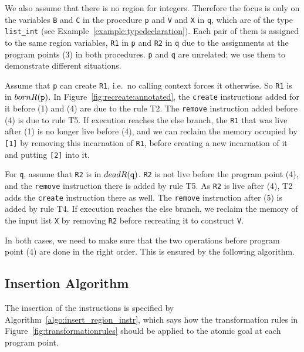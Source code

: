 \documentclass{tlp}
\newcommand{\bornR}[1]{\ensuremath{{bornR}(#1)}}
\newcommand{\deadR}[1]{\ensuremath{{deadR}(#1)}}
\newcommand{\code}[1]{{\tt#1}}
\begin{document}
We also assume that there is no region for integers.
Therefore the focus is only on
the variables \code{B} and \code{C} in the procedure \code{p} and
\code{V} and \code{X} in \code{q},
which are of the type \code{list\_int}
(see Example~\ref{example:typedeclaration}).
Each pair of them is assigned to the same region variables,
\code{R1} in \code{p} and \code{R2} in \code{q}
due to the assignments at the program points (3) in both procedures.
\code{p} and \code{q} are unrelated;
we use them to demonstrate different situations.

Assume that \code{p} can create \code{R1},
i.e.\ no calling context forces it otherwise.
So \code{R1} is in \bornR{\code{p}}.
In Figure~\ref{fig:recreate:annotated},
the \code{create} instructions added for it before (1) and (4)
are due to the rule T2.
The \code{remove} instruction added before (4) is due to rule T5.
If execution reaches the else branch,
the \code{R1} that was live after (1) is no longer live before (4),
and we can reclaim the memory occupied by \code{[1]}
by removing this incarnation of \code{R1},
before creating a new incarnation of it
and putting \code{[2]} into it.

For \code{q}, assume that \code{R2} is in \deadR{\code{q}}.
\code{R2} is not live before the program point (4),
and the \code{remove} instruction there is added by rule T5.
As \code{R2} is live after (4),
T2 adds the \code{create} instruction there as well.
The \code{remove} instruction after (5) is added by rule T4.
If execution reaches the else branch,
we reclaim the memory of the input list \code{X} by removing \code{R2}
before recreating it to construct \code{V}.

In both cases, we need to make sure that
the two operations before program point (4) are done in the right order.
This is ensured by the following algorithm.

\subsection{Insertion Algorithm}

The insertion of the instructions
is specified by Algorithm~\ref{algo:insert_region_instr},
which says how the transformation rules in Figure~\ref{fig:transformationrules}
should be applied to the atomic goal at each program point.
\end{document}
